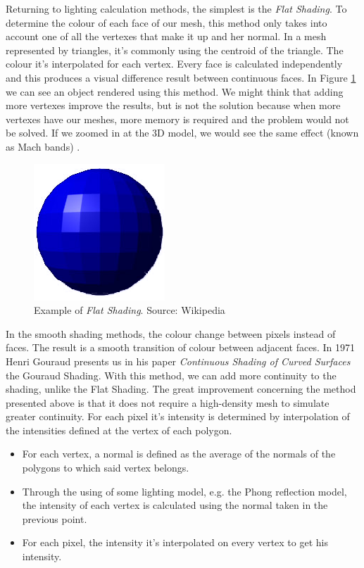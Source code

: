\documentclass[titlepage,12pt]{article}
\begin{document}
Returning to lighting calculation methods, the simplest is the \textit{Flat Shading}. To determine the colour of each face of our mesh, this method only takes into account one of all the vertexes that make it up and her normal. In a mesh represented by triangles, it's commonly using the centroid of the triangle. The colour it's interpolated for each vertex. Every face is calculated independently and this produces a visual difference result between continuous faces. In Figure \ref{flat:shading} we can see an object rendered using this method. We might think that adding more vertexes improve the results, but is not the solution because when more vertexes have our meshes, more memory is required and the problem would not be solved. If we zoomed in at the 3D model, we would see the same effect (known as Mach bands) \citep[pp.~5245--5250]{Lotto1999}.

\begin{figure}[H]
	\centering
	\includegraphics[scale=0.5]{media/Flat-shading-sample.png}
	\caption{Example of \textit{Flat Shading}. Source: Wikipedia}
	\label{flat:shading}
\end{figure}

In the smooth shading methods, the colour change between pixels instead of faces. The result is a smooth transition of colour between adjacent faces.
In 1971 Henri Gouraud presents us in his paper \textit{Continuous Shading of Curved Surfaces} \citep[pp.~623--629]{Henri1971} the Gouraud Shading. With this method, we can add more continuity to the shading, unlike the Flat Shading. The great improvement concerning the method presented above is that it does not require a high-density mesh to simulate greater continuity. For each pixel it's intensity is determined by interpolation of the intensities defined at the vertex of each polygon.

\begin{itemize}
	\item For each vertex, a normal is defined as the average of the normals of the polygons to which said vertex belongs.
	\item Through the using of some lighting model,  e.g. the Phong reflection model, the intensity of each vertex is calculated using the normal taken in the previous point.
	\item For each pixel, the intensity it's interpolated on every vertex to get his intensity.
\end{itemize} 
\end{document}
